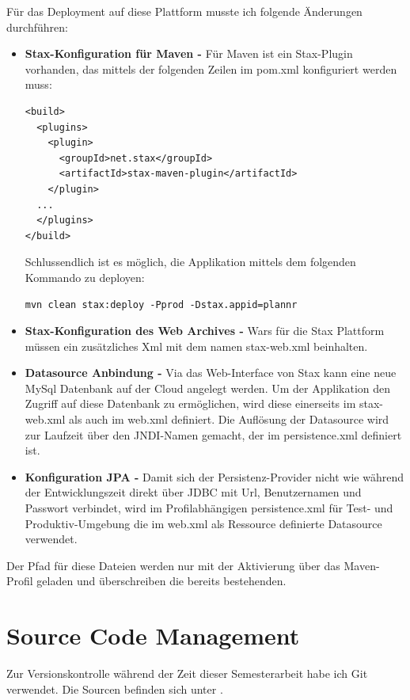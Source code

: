 F\"ur das Deployment auf diese Plattform musste ich folgende \"Anderungen durchf\"uhren:
\begin{itemize}
\item \textbf{Stax-Konfiguration f\"ur Maven - } F\"ur Maven ist ein Stax-Plugin vorhanden, das mittels der folgenden Zeilen im pom.xml konfiguriert werden muss: 

\begin{lstlisting}[caption=Konfiguration Maven mit Stax]
<build>
  <plugins>
    <plugin>
      <groupId>net.stax</groupId>
      <artifactId>stax-maven-plugin</artifactId>
    </plugin>
  ...
  </plugins>
</build>
\end{lstlisting}
Schlussendlich ist es m\"oglich, die Applikation mittels dem folgenden Kommando zu deployen:
\begin{lstlisting}[caption=Befehl Deployment Stax]
mvn clean stax:deploy -Pprod -Dstax.appid=plannr
\end{lstlisting}
\item \textbf{Stax-Konfiguration des Web Archives - } Wars f\"ur die Stax Plattform m\"ussen ein zus\"atzliches Xml mit dem namen stax-web.xml beinhalten. 
\item \textbf{Datasource Anbindung - } Via das Web-Interface von Stax kann eine neue MySql Datenbank auf der Cloud angelegt werden. Um der Applikation den Zugriff auf diese Datenbank zu erm\"oglichen, wird diese einerseits im stax-web.xml als auch im web.xml definiert. Die Aufl\"osung der Datasource wird zur Laufzeit \"uber den JNDI-Namen gemacht, der im persistence.xml definiert ist.
\item \textbf{Konfiguration JPA -} Damit sich der Persistenz-Provider nicht wie w\"ahrend der Entwicklungszeit direkt \"uber JDBC mit Url, Benutzernamen und Passwort verbindet, wird im Profilabh\"angigen persistence.xml f\"ur Test- und Produktiv-Umgebung die im web.xml als Ressource definierte Datasource verwendet. 
\end{itemize} 

Der Pfad f\"ur diese Dateien werden nur mit der Aktivierung \"uber das Maven-Profil geladen und \"uberschreiben die bereits bestehenden.

\section{Source Code Management}
Zur Versionskontrolle w\"ahrend der Zeit dieser Semesterarbeit habe ich Git \cite{Git} verwendet. Die Sourcen befinden sich unter \cite{gitRepo}.







